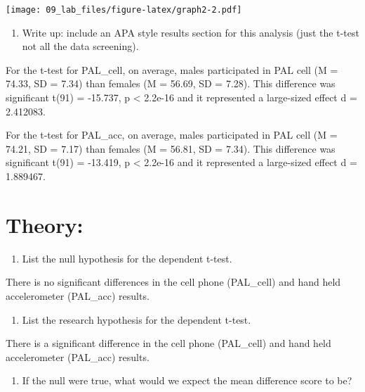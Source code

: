 \documentclass[
]{article}
\providecommand{\tightlist}{%
  \setlength{\itemsep}{0pt}\setlength{\parskip}{0pt}}
\begin{document}
\texttt{[image: 09\_lab\_files/figure-latex/graph2-2.pdf]}

\begin{enumerate}
\def\labelenumi{\arabic{enumi})}
\setcounter{enumi}{9}
\tightlist
\item
  Write up: include an APA style results section for this analysis (just
  the t-test not all the data screening).
\end{enumerate}

For the t-test for PAL\_cell, on average, males participated in PAL cell
(M = 74.33, SD = 7.34) than females (M = 56.69, SD = 7.28). This
difference was significant t(91) = -15.737, p \textless{} 2.2e-16 and it
represented a large-sized effect d = 2.412083.

For the t-test for PAL\_acc, on average, males participated in PAL cell
(M = 74.21, SD = 7.17) than females (M = 56.81, SD = 7.34). This
difference was significant t(91) = -13.419, p \textless{} 2.2e-16 and it
represented a large-sized effect d = 1.889467.

\hypertarget{theory}{%
\section{Theory:}\label{theory}}

\begin{enumerate}
\def\labelenumi{\arabic{enumi})}
\setcounter{enumi}{10}
\tightlist
\item
  List the null hypothesis for the dependent t-test.
\end{enumerate}

There is no significant differences in the cell phone (PAL\_cell) and
hand held accelerometer (PAL\_acc) results.

\begin{enumerate}
\def\labelenumi{\arabic{enumi})}
\setcounter{enumi}{11}
\tightlist
\item
  List the research hypothesis for the dependent t-test.
\end{enumerate}

There is a significant difference in the cell phone (PAL\_cell) and hand
held accelerometer (PAL\_acc) results.

\begin{enumerate}
\def\labelenumi{\arabic{enumi})}
\setcounter{enumi}{12}
\tightlist
\item
  If the null were true, what would we expect the mean difference score
  to be?
\end{enumerate}
\end{document}
